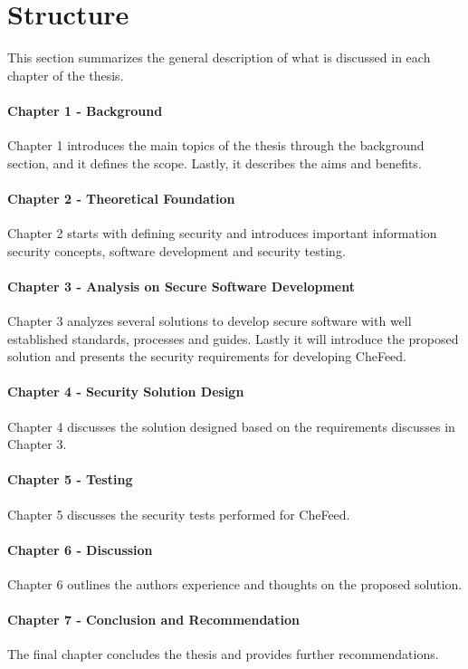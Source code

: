 \section{Structure}
This section summarizes the general description of what is discussed in each chapter of the thesis.

\paragraph{Chapter 1 - Background}
Chapter 1 introduces the main topics of the thesis through the background section, and it defines the scope. Lastly, it describes the aims and benefits.

\paragraph{Chapter 2 - Theoretical Foundation}
Chapter 2 starts with defining security and introduces important information security concepts, software development and security testing.

\paragraph{Chapter 3 - Analysis on Secure Software Development}
Chapter 3 analyzes several solutions to develop secure software with well established standards, processes and guides. Lastly it will introduce the proposed solution and presents the security requirements for developing CheFeed.

\paragraph{Chapter 4 - Security Solution Design}
Chapter 4 discusses the solution designed based on the requirements discusses in Chapter 3.

\paragraph{Chapter 5 - Testing}
Chapter 5 discusses the security tests performed for CheFeed. 

\paragraph{Chapter 6 - Discussion}
Chapter 6 outlines the authors experience and thoughts on the proposed solution.

\paragraph{Chapter 7 - Conclusion and Recommendation}
The final chapter concludes the thesis and provides further recommendations.


